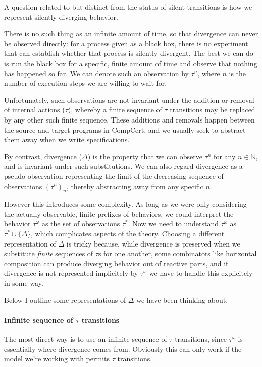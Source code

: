 \documentclass[11pt]{article}
\begin{document}
A question related to but distinct from
the status of silent transitions is
how we represent silently diverging behavior.

There is no such thing as an infinite amount of time,
so that divergence can never be observed directly:
for a process given as a black box,
there is no experiment that can establish
whether that process is silently divergent.
The best we can do is run the black box for a specific, finite amount of time
and observe that nothing has happened so far.
We can denote such an observation by $\tau^n$,
where $n$ is the number of execution steps we are willing to wait for.

Unfortunately,
such observations are not invariant under
the addition or removal of internal actions ($\tau$),
whereby a finite sequence of $\tau$ transitions
may be replaced by any other such finite sequence.
These additions and removals
happen between the source and target programs
in CompCert, and
we usually seek to abstract them away
when we write specifications.

By contrast,
divergence ($\Delta$) is the property that we can observe $\tau^n$
for any $n \in \mathbb{N}$,
and is invariant under such substitutions.
We can also regard divergence as a pseudo-observation
representing the limit of
the decreasing sequence of observations $(\tau^n)_n$,
thereby abstracting away from any specific $n$.

However this introduces some complexity.
As long as we were only considering the actually observable,
finite prefixes of behaviors,
we could interpret the behavior $\tau^\omega$
as the set of observations $\tau^*$.
Now we need to understand $\tau^\omega$ as $\tau^* \cup \{\Delta\}$,
which complicates aspects of the theory.
Choosing a different representation of $\Delta$ is tricky because,
while divergence is preserved
when we substitute \emph{finite} sequences of $\tau$s for one another,
some combinators like horizontal composition
can produce diverging behavior out of reactive parts,
and if divergence is not represented implicitely by $\tau^\omega$
we have to handle this explicitely in some way.

Below I outline some representations of $\Delta$
we have been thinking about.

\paragraph{Infinite sequence of $\tau$ transitions}

The most direct way is to use an infinite sequence of $\tau$ transitions,
since $\tau^\omega$ is essentially where divergence comes from.
Obviously this can only work if the model we're working with
permits $\tau$ transitions.
\end{document}
